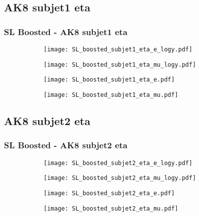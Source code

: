 \documentclass[aspectratio=169,8pt]{beamer}
\begin{document}
\subsection{AK8 subjet1 eta}
\begin{frame}
\frametitle{SL Boosted - AK8 subjet1 eta}
\begin{figure}
\captionsetup[subfigure]{labelformat=empty}
\begin{subfigure}{0.375\textwidth}
\texttt{[image: SL\_boosted\_subjet1\_eta\_e\_logy.pdf]}
\vspace*{-0.15cm}
\end{subfigure}
\hfil
\begin{subfigure}{0.375\textwidth}
\texttt{[image: SL\_boosted\_subjet1\_eta\_mu\_logy.pdf]}
\vspace*{-0.15cm}
\end{subfigure}
\hfil
\begin{subfigure}{0.375\textwidth}
\texttt{[image: SL\_boosted\_subjet1\_eta\_e.pdf]}
\vspace*{-0.15cm}
\end{subfigure}
\hfil
\begin{subfigure}{0.375\textwidth}
\texttt{[image: SL\_boosted\_subjet1\_eta\_mu.pdf]}
\vspace*{-0.15cm}
\end{subfigure}
\hfil
\end{figure}
\end{frame}
\newpage

\subsection{AK8 subjet2 eta}
\begin{frame}
\frametitle{SL Boosted - AK8 subjet2 eta}
\begin{figure}
\captionsetup[subfigure]{labelformat=empty}
\begin{subfigure}{0.375\textwidth}
\texttt{[image: SL\_boosted\_subjet2\_eta\_e\_logy.pdf]}
\vspace*{-0.15cm}
\end{subfigure}
\hfil
\begin{subfigure}{0.375\textwidth}
\texttt{[image: SL\_boosted\_subjet2\_eta\_mu\_logy.pdf]}
\vspace*{-0.15cm}
\end{subfigure}
\hfil
\begin{subfigure}{0.375\textwidth}
\texttt{[image: SL\_boosted\_subjet2\_eta\_e.pdf]}
\vspace*{-0.15cm}
\end{subfigure}
\hfil
\begin{subfigure}{0.375\textwidth}
\texttt{[image: SL\_boosted\_subjet2\_eta\_mu.pdf]}
\vspace*{-0.15cm}
\end{subfigure}
\hfil
\end{figure}
\end{frame}
\newpage
\end{document}
